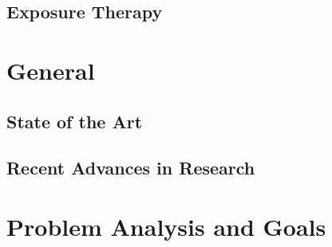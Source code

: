 \subsection{Exposure Therapy}
%
\section{General}
\subsection{State of the Art}
\subsection{Recent Advances in Research}
\section{Problem Analysis and Goals}
%
%
